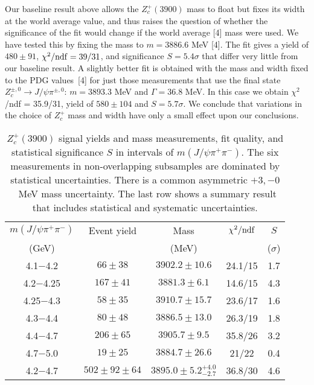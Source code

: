 \documentclass[aps,prd,twocolumn,superscriptaddress,groupedaddress,floatfix]{revtex4}
\begin{document}
Our baseline result above allows the $Z_c^+(3900)$ mass to float but fixes its width at the world average value, and thus raises the question of whether the significance of the fit would change if the world average [4] mass were used.  We have tested this by fixing the mass to $m = 3886.6$ MeV [4].  The fit gives a yield
of $480 \pm 91$, $\chi^2/{\rm ndf} = 39/31$, and significance $S=5.4\sigma$ that differ very little 
from our baseline result. A slightly better fit is obtained 
 with the mass and width fixed to the PDG values~[4] for just those measurements that use the final state $Z_c^{\pm,0} \rightarrow J/\psi \pi^{\pm,0}$:  $m = 3893.3$ MeV and $\Gamma = 36.8$ MeV.  In this case we obtain $\chi^2$/ndf = 35.9/31, yield 
of $580 \pm 104$ and  $S=5.7\sigma$.  We conclude that variations in the choice of $Z_c^+$ mass and width have only a small effect upon our conclusions.




 \begin{table}[h]
\begin{center}
\caption{ $Z_c^+(3900)$ signal yields and mass measurements, fit quality, and statistical significance $S$ 
in intervals of $m(J/\psi \pi^+ \pi^-)$.
The  six measurements in non-overlapping subsamples are dominated by statistical
uncertainties. There is a common asymmetric $+3,-0$~MeV mass uncertainty.
The last row shows a summary result that includes  statistical and systematic uncertainties. }
\def\arraystretch{1.0}
\begin{tabular}{ccccc}\hline \hline 
$m(J/\psi \pi^+ \pi^-)$   & Event yield &  Mass  & $\chi^2/{\rm ndf}$ & $S$  \\
(GeV)  & & (MeV)  & &  ($\sigma$) \\ \hline
4.1$-$4.2           & $66\pm 38$ & $3902.2\pm 10.6$  & 24.1/15 & 1.7  \\    
4.2$-$4.25           & $167\pm 41 $ & $3881.3\pm 6.1$ & 14.6/15 & 4.3   \\    
4.25$-$4.3           & $58\pm 35  $ & $3910.7\pm 15.7$ &  23.6/17 & 1.6 \\  
4.3$-$4.4           & $80\pm 48  $ & $3886.5\pm 13.0$ & 26.3/19 & 1.8  \\
4.4$-$4.7           & $206\pm 65 $ & $3905.7\pm 9.5$ & 35.8/26 & 3.2  \\ 
4.7$-$5.0           & $19\pm 25 $ & $3884.7\pm 26.6$ & 21/22 & 0.4  \\ \hline
4.2$-$4.7           & $502\pm 92 \pm 64$ & $3895.0\pm 5.2 ^{+4.0}_{-2.7} $  & 36.8/30 & 4.6 \\    
\hline \hline
\end{tabular}
\label{tab:results}
\end{center}
\end{table}
\end{document}
